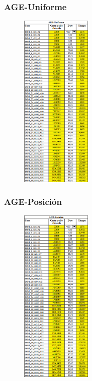 \documentclass{article}
\begin{document}
    \pagebreak
    \subsubsection{AGE-Uniforme}

    \begin{figure}[h]
        \centering
        \includegraphics[width=0.3\textwidth]{tablaAGEU.png}
    \end{figure}

    \pagebreak
    \subsubsection{AGE-Posición}

    \begin{figure}[h]
        \centering
        \includegraphics[width=0.3\textwidth]{tablaAGEP.png}
    \end{figure}
\end{document}
